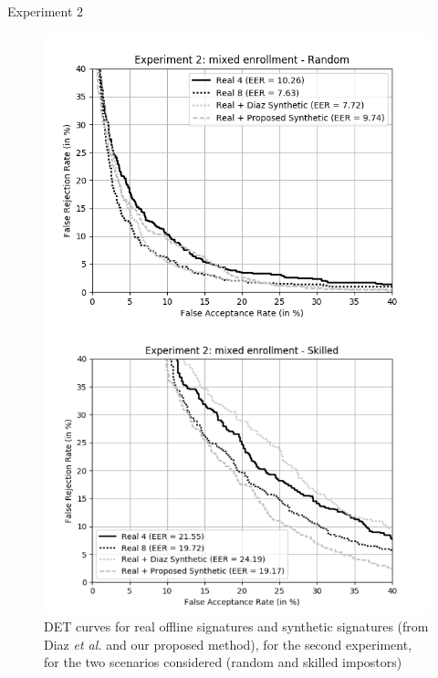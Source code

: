 \documentclass{beamer}
\begin{document}
\begin{frame}{Experiment 2}
\begin{figure}[!htb]
    \centering
    \includegraphics[height=0.8\textheight]{rocs/experiment2}
    \caption{DET curves for real offline signatures and synthetic signatures (from Diaz \textit{et al.} and our proposed method), for the second experiment, for the two scenarios considered (random and skilled impostors)}
    \label{fig:exp2}
\end{figure}
\end{frame}
\end{document}
